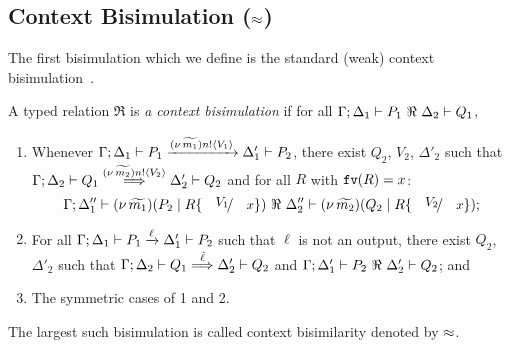 \subsection{Context Bisimulation ($\approx$)}
\label{subsec:bisimulation}
\noi The first bisimulation which we define 
is the standard (weak) context bisimulation~\cite{San96H}. 
%
\begin{definition}\rm
\label{def:wbc}
A typed relation $\Re$ is {\em a context bisimulation} if
for all $\horel{\Gamma}{\Delta_1}{P_1}{\ \Re \ }{\Delta_2}{Q_1}$, 
	\begin{enumerate}[1)] 
	\item Whenever 
$\Gamma; \Delta_1 \vdash P_1 \xrightarrow{(\nu\, \widetilde{m_1}) n ! \langle V_1 \rangle} \Delta_1' \vdash P_2$,
there exist 
$Q_2$, $V_2$, $\Delta'_2$
such that 
$\Gamma; \Delta_2 \vdash Q_1 \stackrel{(\nu\, \widetilde{m_2}) n ! \langle V_2 \rangle}{\Longrightarrow} \Delta_2' \vdash Q_2$ and 
for all $R$ with $\mathtt{fv}(R)=x$:
\[\horel{\Gamma}{\Delta_1''}{\newsp{\widetilde{m_1}}{P_2 \Par R\subst{V_1}{x}}}
				{\ \Re\ }
				{\Delta_2''}{\newsp{\widetilde{m_2}}{Q_2 \Par R\subst{V_2}{x}}};\]  
		\item	
For all $\Gamma; \Delta_1 \vdash P_1 \xrightarrow{\ell} \Delta_1' \vdash P_2$ such that 
$\ell$ is not an output, 
 there exist $Q_2$, $\Delta'_2$ such that 
$\Gamma; \Delta_2 \vdash Q_1 \stackrel{\hat{\ell}}{\Longrightarrow} \Delta_2' \vdash Q_2$
			and
			$\horel{\Gamma}{\Delta_1'}{P_2}{\ \Re \ }{\Delta_2'}{Q_2}$; and  

                      \item	The symmetric cases of 1 and 2.                
	\end{enumerate}
	The largest such bisimulation is called context bisimilarity  denoted by $\approx$.
\end{definition}

\smallskip 

